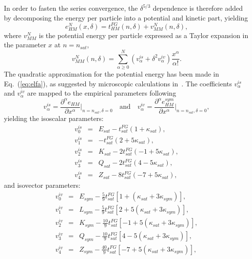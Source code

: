 In order to fasten the series convergence, the $\delta^{5/3}$ dependence is 
therefore added by decomposing the energy per particle into a potential and 
kinetic part, yielding
%
\begin{equation}
  e^N_{HM}(x,\delta) = t_{HM}^{FG}(n,\delta) +
  v_{MM}^N(n,\delta),\label{eq:meta}
\end{equation}
%
where $v_{MM}^N$ is the potential energy per particle expressed as a Taylor expansion
in the parameter $x$ at $n = n_{sat}$,
%
\begin{equation}
  v_{MM}^N(n,\delta) = \sum_{\alpha \geq 0}^N(v_\alpha^{is} +
  \delta^2v_\alpha^{iv})\frac{x^\alpha}{\alpha!}\label{eq:elfa}.
\end{equation}
%
The quadratic approximation for the potential energy has been
made in Eq.~(\ref{eq:elfa}), as suggested by microscopic calculations 
in~\cite{Vidana2009}. The coefficients $v_\alpha^{is}$ and $v_\alpha^{iv}$ are
mapped to the empirical parameters following
%
\begin{equation}
  v_\alpha^{is} = \frac{\partial^\alpha e_{HM}}{\partial
  x^\alpha}\bigg|_{n=n_{sat},\delta=0} \quad \text{and} \quad v_\alpha^{iv} = \frac{\partial^\alpha e_{HM}^{sym}}{\partial
x^\alpha}\bigg|_{n=n_{sat},\delta=0},\label{eq:def_pars}
\end{equation}
%
yielding the isoscalar parameters:
%
\begin{eqnarray}
  v_0^{is} &=& E_{sat} - t_{sat}^{FG}(1+\kappa_{sat}),\\
  v_1^{is} &=& -t_{sat}^{FG}(2+5\kappa_{sat}),\\
  v_2^{is} &=& K_{sat} - 2t_{sat}^{FG}(-1+5\kappa_{sat}),\\
  v_3^{is} &=& Q_{sat} - 2t_{sat}^{FG}(4-5\kappa_{sat}),\\
  v_4^{is} &=& Z_{sat} - 8t_{sat}^{FG}(-7+5\kappa_{sat}),
\end{eqnarray}
%
and isovector parameters:
%
\begin{eqnarray}
  v_0^{iv} &=& E_{sym} - \frac{5}{9}t_{sat}^{FG}[1+(\kappa_{sat}+3\kappa_{sym})],\\
  v_1^{iv} &=& L_{sym} - \frac{5}{9}t_{sat}^{FG}[2+5(\kappa_{sat}+3\kappa_{sym})],\\
  v_2^{iv} &=& K_{sym} - \frac{10}{9}t_{sat}^{FG}[-1+5(\kappa_{sat}
  +3\kappa_{sym})],\\
  v_3^{iv} &=& Q_{sym} - \frac{10}{9}t_{sat}^{FG}[4-5(\kappa_{sat}+3\kappa_{sym})],\\
  v_4^{iv} &=& Z_{sym} -
  \frac{40}{9}t_{sat}^{FG}[-7+5(\kappa_{sat}+3\kappa_{sym})],
\end{eqnarray}
%


